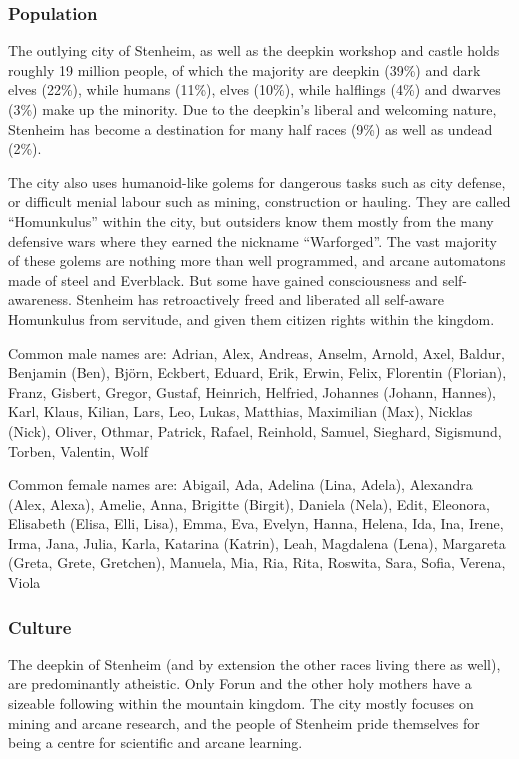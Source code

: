 \subsubsection{Population}

The outlying city of Stenheim, as well as the deepkin workshop and castle holds
roughly 19 million people, of which the majority are deepkin (39\%) and dark
elves (22\%), while humans (11\%), elves (10\%), while halflings (4\%) and
dwarves (3\%) make up the minority. Due to the deepkin's liberal and welcoming
nature, Stenheim has become a destination for many half races (9\%) as well as
undead (2\%).

The city also uses humanoid-like golems for dangerous tasks such as city
defense, or difficult menial labour such as mining, construction or hauling.
They are called ``Homunkulus'' within the city, but outsiders know them mostly
from the many defensive wars where they earned the nickname ``Warforged''. The
vast majority of these golems are nothing more than well programmed, and
arcane automatons made of steel and Everblack. But some have gained
consciousness and self-awareness. Stenheim has retroactively freed and
liberated all self-aware Homunkulus from servitude, and given them citizen
rights within the kingdom.

Common male names are: Adrian, Alex, Andreas, Anselm, Arnold, Axel, Baldur,
Benjamin (Ben), Björn, Eckbert, Eduard, Erik, Erwin, Felix, Florentin
(Florian), Franz, Gisbert, Gregor, Gustaf, Heinrich, Helfried, Johannes
(Johann, Hannes), Karl, Klaus, Kilian, Lars, Leo, Lukas, Matthias,
Maximilian (Max), Nicklas (Nick), Oliver, Othmar, Patrick, Rafael, Reinhold,
Samuel, Sieghard, Sigismund, Torben, Valentin, Wolf

Common female names are: Abigail, Ada, Adelina (Lina, Adela), Alexandra (Alex,
Alexa), Amelie, Anna, Brigitte (Birgit), Daniela (Nela), Edit, Eleonora,
Elisabeth (Elisa, Elli, Lisa), Emma, Eva, Evelyn, Hanna, Helena, Ida, Ina,
Irene, Irma, Jana, Julia, Karla, Katarina (Katrin), Leah, Magdalena (Lena),
Margareta (Greta, Grete, Gretchen), Manuela, Mia, Ria, Rita, Roswita, Sara,
Sofia, Verena, Viola

\subsubsection{Culture}

The deepkin of Stenheim (and by extension the other races living there as
well), are predominantly atheistic. Only Forun and the other holy mothers have
a sizeable following within the mountain kingdom. The city mostly focuses on
mining and arcane research, and the people of Stenheim pride themselves for
being a centre for scientific and arcane learning.

